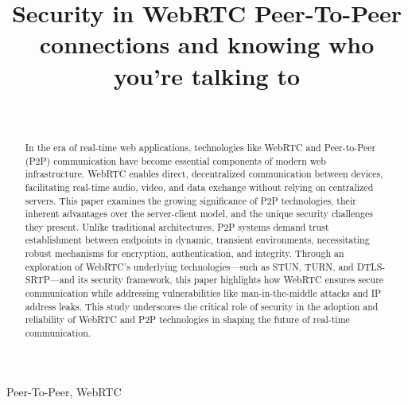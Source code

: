 \documentclass[conference]{IEEEtran}
\begin{document}
\title{Security in WebRTC Peer-To-Peer connections and knowing who you're talking to\\
}

\author{
 \\
\textit{}
}

\maketitle

\begin{abstract}
    In the era of real-time web applications, technologies like WebRTC and Peer-to-Peer (P2P) communication have become essential components of 
    modern web infrastructure. WebRTC enables direct, decentralized communication between devices, facilitating real-time audio, video, and data 
    exchange without relying on centralized servers. This paper examines the growing significance of P2P technologies, their inherent advantages 
    over the server-client model, and the unique security challenges they present. Unlike traditional architectures, P2P systems demand trust 
    establishment between endpoints in dynamic, transient environments, necessitating robust mechanisms for encryption, authentication, and integrity. 
    Through an exploration of WebRTC's underlying technologies—such as STUN, TURN, and DTLS-SRTP—and its security framework, this paper highlights
     how WebRTC ensures secure communication while addressing vulnerabilities like man-in-the-middle attacks and IP address leaks. This study underscores 
     the critical role of security in the adoption and reliability of WebRTC and P2P technologies in shaping the future of real-time communication.
\end{abstract}

\begin{IEEEkeywords}
Peer-To-Peer, WebRTC
\end{IEEEkeywords}
\end{document}
